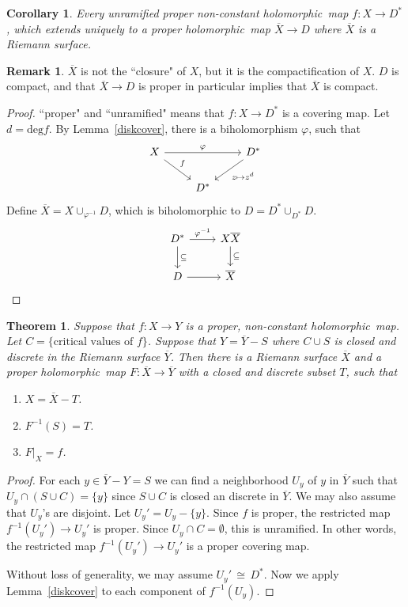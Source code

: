\documentclass[12pt]{article}
\theoremstyle{plain}
\newtheorem{theorem}[equation]{Theorem}
\newtheorem{corollary}[equation]{Corollary}
\theoremstyle{definition}
\newtheorem{remark}[equation]{Remark}
\renewcommand{\deg}{\mathrm{deg}}
\newcommand\iso{{\, \cong \,}}
\newcommand{\<}{\langle}
\renewcommand{\>}{\rangle}
\newcommand{\holo}{holomorphic \,}
\begin{document}
\begin{corollary}
Every unramified proper non-constant \holo map $f : X \to D^*$, which extends uniquely to a proper \holo map $\overline{X} \to D$ where $\overline{X}$ is a Riemann surface.
\end{corollary}
\begin{remark}
$\overline{X}$ is not the ``closure" of $X$, but it is the compactification of $X$. $D$ is compact, and that $\overline{X} \to D$ is proper in particular implies that $\overline{X}$ is compact. 
\end{remark}
\begin{proof}
``proper" and ``unramified" means that $f : X \to D^*$ is a covering map. Let $ d = \deg f$. By Lemma~\ref{diskcover}, there is a biholomorphism $\varphi$, such that 
\[
\begin{tikzcd}
X \arrow{rr}{\varphi} \arrow{dr}{f} && D^* \arrow{dl}{z \mapsto z^d} \\
{} & D^*
\end{tikzcd}
\]
Define $\overline{X} = X \cup_{\varphi^{-1}} D$, which is biholomorphic to $D = D^* \cup_{D^*} D$. 
\[
\begin{tikzcd}
D^* \arrow{r}{\varphi^{-1}} \arrow{d}{\subseteq} & X \arrow{d}{\subseteq} \overline{X} \\
D \arrow{r}{} & \overline{X}
\end{tikzcd}
\]

\end{proof}

\begin{theorem}
\label{patch}
Suppose that $f : X \to Y$ is a proper, non-constant \holo map. Let $C = \{ \text{critical values of }f\}$. Suppose that $Y = \overline{Y} - S$ where $C \cup S$ is closed and discrete in the Riemann surface $\overline{Y}$. Then there is a Riemann surface $\overline{X}$ and a proper \holo map $F : \overline{X} \to \overline{Y}$ with a closed and discrete subset $T$, such that 
\begin{enumerate}
\item $ X = \overline{X} - T$. 
\item $F^{-1}(S) = T$. 
\item $F|_X = f$. 
\end{enumerate}
\end{theorem}
\begin{proof}
For each $y \in \overline{Y} - Y = S$ we can find a neighborhood $U_y$ of $y$ in $\overline{Y}$ such that $U_y \cap (S \cup C) = \{ y \}$ since $S \cup C$ is closed an discrete in $\overline{Y}$. We may also assume that $U_y$'s are disjoint. Let $U_y' = U_y - \{ y \}$. Since $f$ is proper, the restricted map $f^{-1}(U_y') \to U_y'$ is proper. Since $U_y \cap C = \emptyset$, this is unramified. In other words, the restricted map $f^{-1}(U_y') \to U_y'$ is a proper covering map. 

Without loss of generality, we may assume $U_y' \iso D^*$. Now we apply Lemma~\ref{diskcover} to each component of $f^{-1}(U_y)$.   
\end{proof}
\end{document}
